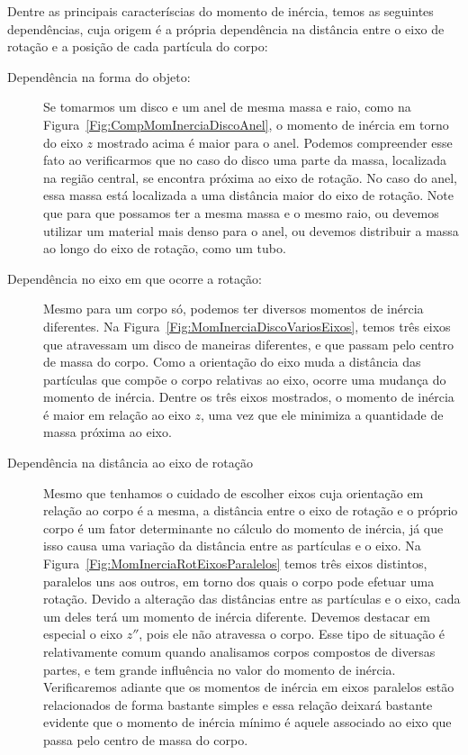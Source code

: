 Dentre as principais caracteríscias do momento de inércia, temos as seguintes dependências, cuja origem é a própria dependência na distância entre o eixo de rotação e a posição de cada partícula do corpo:
\begin{description}
    \item[Dependência na forma do objeto:] Se tomarmos um disco e um anel de mesma massa e raio, como na Figura~\ref{Fig:CompMomInerciaDiscoAnel}, o momento de inércia em torno do eixo $z$ mostrado acima é maior para o anel. Podemos compreender esse fato ao verificarmos que no caso do disco uma parte da massa, localizada na região central, se encontra próxima ao eixo de rotação. No caso do anel, essa massa está localizada a uma distância maior do eixo de rotação. Note que para que possamos ter a mesma massa e o mesmo raio, ou devemos utilizar um material mais denso para o anel, ou devemos distribuir a massa ao longo do eixo de rotação, como um tubo.
    \item[Dependência no eixo em que ocorre a rotação:] Mesmo para um corpo só, podemos ter diversos momentos de inércia diferentes. Na Figura~\ref{Fig:MomInerciaDiscoVariosEixos}, temos três eixos que atravessam um disco de maneiras diferentes, e que passam pelo centro de massa do corpo. Como a orientação do eixo muda a distância das partículas que compõe o corpo relativas ao eixo, ocorre uma mudança do momento de inércia. Dentre os três eixos mostrados, o momento de inércia é maior em relação ao eixo $z$, uma vez que ele minimiza a quantidade de massa próxima ao eixo.
    \item[Dependência na distância ao eixo de rotação] Mesmo que tenhamos o cuidado de escolher eixos cuja orientação em relação ao corpo é a mesma, a distância entre o eixo de rotação e o próprio corpo é um fator determinante no cálculo do momento de inércia, já que isso causa uma variação da distância entre as partículas e o eixo. Na Figura~\ref{Fig:MomInerciaRotEixosParalelos} temos três eixos distintos, paralelos uns aos outros, em torno dos quais o corpo pode efetuar uma rotação. Devido a alteração das distâncias entre as partículas e o eixo, cada um deles terá um momento de inércia diferente. Devemos destacar em especial o eixo $z''$, pois ele não atravessa o corpo. Esse tipo de situação é relativamente comum quando analisamos corpos compostos de diversas partes, e tem grande influência no valor do momento de inércia. Verificaremos adiante que os momentos de inércia em eixos paralelos estão relacionados de forma bastante simples e essa relação deixará bastante evidente que o momento de inércia mínimo é aquele associado ao eixo que passa pelo centro de massa do corpo.
\end{description}

